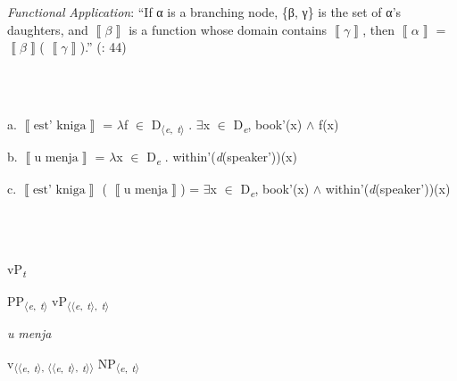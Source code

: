 \documentclass[output=paper,modfonts,nonflat]{langsci/langscibook}
\begin{document}
\ea%
    \label{ex:key:10}
    \gll\\
        \\
    \glt
    \z

          \textit{Functional} \textit{Application}: “If α is a branching node, \{β, γ\} is the set of α’s daughters, and  $\left\llbracket \beta \right\rrbracket $  is a function whose domain contains  $\left\llbracket \gamma \right\rrbracket $, then  $\left\llbracket \alpha \right\rrbracket $ =  $\left\llbracket \beta \right\rrbracket $( $\left\llbracket \gamma \right\rrbracket $).” (\citealt{HeimKratzer1998}: 44)  

\ea%
    \label{ex:key:11}
    \gll\\
        \\
    \glt
    \z

          a.   $\left\llbracket \text{est’ kniga}\right\rrbracket $ = ${\lambda}$f ${\in}$ D\textsubscript{${\langle}$}\textit{\textsubscript{e}}\textsubscript{,} \textit{\textsubscript{t}}\textsubscript{${\rangle}$} . ${\exists}$x ${\in}$ D\textit{\textsubscript{e}}, book'(x) ${\wedge}$ f(x)  

  b.   $\left\llbracket \text{u menja}\right\rrbracket $ = ${\lambda}$x ${\in}$ D\textit{\textsubscript{e}} . within'(\textit{d}(speaker'))(x)

  c.   $\left\llbracket \text{est’ kniga}\right\rrbracket $ ( $\left\llbracket \text{u menja}\right\rrbracket $) = ${\exists}$x ${\in}$ D\textit{\textsubscript{e}}, book'(x) ${\wedge}$                   within'(\textit{d}(speaker'))(x) 

\ea%
    \label{ex:key:12}
    \gll\\
        \\
    \glt
    \z

          vP\textit{\textsubscript{t}}

  PP\textsubscript{${\langle}$}\textit{\textsubscript{e}}\textsubscript{,} \textit{\textsubscript{t}}\textsubscript{${\rangle}$}  vP\textsubscript{${\langle}{\langle}$}\textit{\textsubscript{e}}\textsubscript{,} \textit{\textsubscript{t}}\textsubscript{${\rangle}$,} \textit{\textsubscript{t}}\textsubscript{${\rangle}$}

  \textit{u} \textit{menja} 

    v\textsubscript{${\langle}{\langle}$}\textit{\textsubscript{e}}\textsubscript{,} \textit{\textsubscript{t}}\textsubscript{${\rangle}$, ${\langle}{\langle}$}\textit{\textsubscript{e}}\textsubscript{,} \textit{\textsubscript{t}}\textsubscript{${\rangle}$,} \textit{\textsubscript{t}}\textsubscript{${\rangle}{\rangle}$}  NP\textsubscript{${\langle}$}\textit{\textsubscript{e}}\textsubscript{,} \textit{\textsubscript{t}}\textsubscript{${\rangle}$} 
\end{document}
